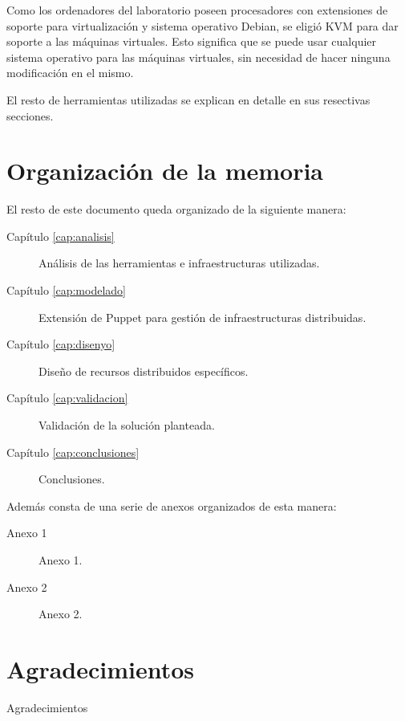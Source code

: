 Como los ordenadores del laboratorio poseen procesadores con extensiones de soporte para virtualización y sistema operativo Debian, se eligió KVM para dar soporte a las máquinas virtuales. Esto significa que se puede usar cualquier sistema operativo para las máquinas virtuales, sin necesidad de hacer ninguna modificación en el mismo.

El resto de herramientas utilizadas se explican en detalle en sus resectivas secciones.


\section{Organización de la memoria}

El resto de este documento queda organizado de la siguiente manera:
\begin{description}
\item[Capítulo \ref{cap:analisis}] Análisis de las herramientas e infraestructuras utilizadas.
\item[Capítulo \ref{cap:modelado}] Extensión de Puppet para gestión de infraestructuras distribuidas.
\item[Capítulo \ref{cap:disenyo}] Diseño de recursos distribuidos específicos.
\item[Capítulo \ref{cap:validacion}] Validación de la solución planteada.
\item[Capítulo \ref{cap:conclusiones}] Conclusiones.
\end{description}

Además consta de una serie de anexos organizados de esta manera:
\begin{description}
\item[Anexo 1] Anexo 1.
\item[Anexo 2] Anexo 2.
\end{description}


\section{Agradecimientos}

Agradecimientos
